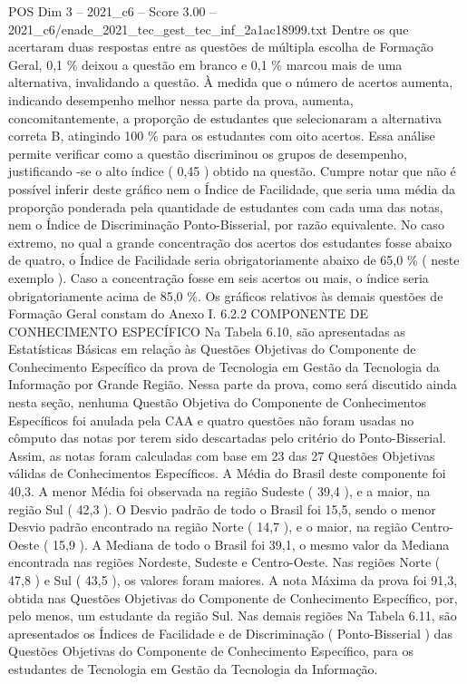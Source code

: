 \begin{textsample}{POS Dim 3 – 2021\_c6 – Score 3.00 – 2021\_c6/enade\_2021\_tec\_gest\_tec\_inf\_2a1ac18999.txt}
Dentre os que acertaram duas respostas entre as questões de múltipla escolha de Formação Geral, 0,1 \% deixou a questão em branco e 0,1 \% marcou mais de uma alternativa, invalidando a questão.
À medida que o número de acertos aumenta, indicando desempenho melhor nessa parte da prova, aumenta, concomitantemente, a proporção de estudantes que selecionaram a alternativa correta B, atingindo 100 \% para os estudantes com oito acertos.
Essa análise permite verificar como a questão discriminou os grupos de desempenho, justificando -se o alto índice ( 0,45 ) obtido na questão.
Cumpre notar que não é possível inferir deste gráfico nem o Índice de Facilidade, que seria uma média da proporção ponderada pela quantidade de estudantes com cada uma das notas, nem o Índice de Discriminação Ponto-Bisserial, por razão equivalente.
No caso extremo, no qual a grande concentração dos acertos dos estudantes fosse abaixo de quatro, o Índice de Facilidade seria obrigatoriamente abaixo de 65,0 \% ( neste exemplo ).
Caso a concentração fosse em seis acertos ou mais, o índice seria obrigatoriamente acima de 85,0 \%.
Os gráficos relativos às demais questões de Formação Geral constam do Anexo I. 6.2.2 COMPONENTE DE CONHECIMENTO ESPECÍFICO Na Tabela 6.10, são apresentadas as Estatísticas Básicas em relação às Questões Objetivas do Componente de Conhecimento Específico da prova de Tecnologia em Gestão da Tecnologia da Informação por Grande Região.
Nessa parte da prova, como será discutido ainda nesta seção, nenhuma Questão Objetiva do Componente de Conhecimentos Específicos foi anulada pela CAA e quatro questões não foram usadas no cômputo das notas por terem sido descartadas pelo critério do Ponto-Bisserial.
Assim, as notas foram calculadas com base em 23 das 27 Questões Objetivas válidas de Conhecimentos Específicos.
A Média do Brasil deste componente foi 40,3.
A menor Média foi observada na região Sudeste ( 39,4 ), e a maior, na região Sul ( 42,3 ).
O Desvio padrão de todo o Brasil foi 15,5, sendo o menor Desvio padrão encontrado na região Norte ( 14,7 ), e o maior, na região Centro-Oeste ( 15,9 ).
A Mediana de todo o Brasil foi 39,1, o mesmo valor da Mediana encontrada nas regiões Nordeste, Sudeste e Centro-Oeste.
Nas regiões Norte ( 47,8 ) e Sul ( 43,5 ), os valores foram maiores.
A nota Máxima da prova foi 91,3, obtida nas Questões Objetivas do Componente de Conhecimento Específico, por, pelo menos, um estudante da região Sul.
Nas demais regiões Na Tabela 6.11, são apresentados os Índices de Facilidade e de Discriminação ( Ponto-Bisserial ) das Questões Objetivas do Componente de Conhecimento Específico, para os estudantes de Tecnologia em Gestão da Tecnologia da Informação.

\end{textsample}

